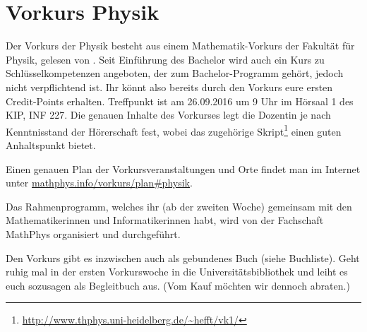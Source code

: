 \section{Vorkurs Physik}
Der Vorkurs der Physik besteht aus einem Mathematik-Vorkurs der Fakultät für Physik, gelesen von \dozentvorkurs.
Seit Einführung des Bachelor wird auch ein Kurs zu Schlüsselkompetenzen angeboten, der zum Bachelor-Programm gehört, jedoch nicht verpflichtend ist.
Ihr könnt also bereits durch den Vorkurs eure ersten Credit-Points erhalten.
Treffpunkt ist am 26.09.2016 um 9 Uhr im Hörsaal 1 des \Gls{KIP}, \Gls{INF} 227. Die genauen Inhalte des Vorkurses legt die Dozentin je nach Kenntnisstand der Hörerschaft fest, wobei das zugehörige Skript\footnote{\url{http://www.thphys.uni-heidelberg.de/~hefft/vk1/}} einen guten Anhaltspunkt bietet.

Einen genauen Plan der Vorkursveranstaltungen und Orte findet man im Internet  unter \url{mathphys.info/vorkurs/plan\#physik}.

Das Rahmenprogramm, welches ihr (ab der zweiten Woche) gemeinsam mit den Mathematikerinnen und Informatikerinnen habt, wird von der Fachschaft MathPhys organisiert und durchgeführt.

Den Vorkurs gibt es inzwischen auch als gebundenes Buch (siehe Buchliste).
Geht ruhig mal in der ersten Vorkurswoche in die Universitätsbibliothek und leiht es euch sozusagen als Begleitbuch aus.
(Vom Kauf möchten wir dennoch abraten.)
